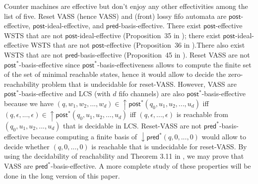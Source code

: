 \documentclass[runningheads]{llncs}
\newcommand{\alain}[1]{\todo[inline,color=red!20]{{\bf AF:} #1}}
\newcommand{\pred}{\textsf{pred}}
\newcommand{\post}{\textsf{post}}
\begin{document}
Counter machines are effective but don't enjoy any other effectivities among the list of five.
Reset VASS (hence VASS) and (front) lossy fifo automata are $\post$-effective, $\post$-ideal-effective, and $\pred$-basis-effective. There exist $\post$-effective WSTS that are not $\post$-ideal-effective (Proposition~35 in \cite{BFM-ic17}); there exist $\post$-ideal-effective WSTS that are not $\post$-effective (Proposition~36 in \cite{BFM-ic17}).There also exist WSTS that are not $\pred$-basis-effective (Proposition~45 in \cite{BFM-ic17}).
Reset VASS are not $\post^*$-basis-effective since $\post^*$-basis-effectiveness allows to compute the finite set of the set of minimal reachable states, hence it would allow to decide the zero-reachability problem that is undecidable for reset-VASS. However, VASS are $\post^*$-basis-effective \cite{DBLP:journals/corr/abs-2108-00889} and LCS (with $d$ fifo channels) are also $\post^*$-basis-effective because we have $(q,w_1,w_2,...,w_d) \in \mathop{\uparrow} \post^*(q_0,u_1,u_2,...,u_d)$ iff $(q,\epsilon,...,\epsilon)  \in \mathop{\uparrow} \post^*(q_0,u_1,u_2,...,u_d)$ iff $(q,\epsilon,...,\epsilon)$ is reachable from $(q_0,u_1,u_2,...,u_d)$ that is decidable in LCS.
%
Reset-VASS are not $\pred^*$-basis-effective because computing a finite basis of $\mathop{\downarrow} \pred^*(q,0,...,0)$ would allow to decide whether $(q,0,...,0)$ is reachable that is undecidable for reset-VASS.
By using the decidability of reachability and Theorem 3.11 in \cite{DBLP:journals/acta/ValkJ85}, we may prove that VASS are $\pred^*$-basis-effective. A more complete study of these properties will be done in the long version of this paper.





\end{document}
